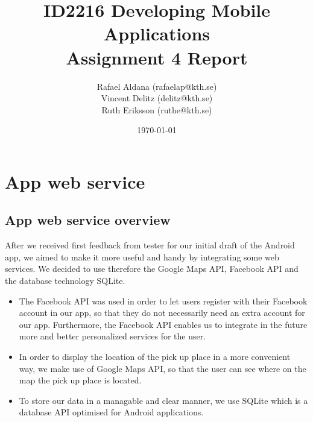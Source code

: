 \documentclass[11pt,twoside,a4paper]{report}
\begin{document}
\title{ID2216 Developing Mobile Applications\\Assignment 4 Report}
\author{Rafael Aldana (rafaelap@kth.se)\\Vincent Delitz (delitz@kth.se)\\Ruth Eriksson (ruthe@kth.se)}
\date{\today}
\maketitle



\tableofcontents
\thispagestyle{empty}



\renewcommand{\chaptername}{Assignment}
\setcounter{chapter}{3}


\chapter{App web service}
\label{assignment:app-web-service}

\section{App web service overview}

After we received first feedback from tester for our initial draft of the Android app, we aimed to make it more useful and handy by integrating some web services. We decided to use therefore the Google Maps API, Facebook API and the database technology SQLite. 

\begin{itemize}
\item The Facebook API was used in order to let users register with their Facebook account in our app, so that they do not necessarily need an extra account for our app. Furthermore, the Facebook API enables us to integrate in the future more and better personalized services for the user.

\item In order to display the location of the pick up place in a more convenient way, we make use of Google Maps API, so that the user can see where on the map the pick up place is located.

\item To store our data in a managable and clear manner, we use SQLite which is a database API optimised for Android applications.

\end{itemize}
\end{document}

